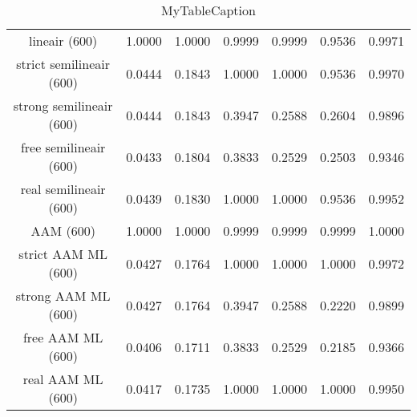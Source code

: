 \begin{table}
\centering
\begin{tabular}{|c|c|c|c|c|c|c|}
\hline
 &  &  &  &  &  &  \\
\hline
lineair (600) & 1.0000 & 1.0000 & 0.9999 & 0.9999 & 0.9536 & 0.9971 \\
\hline
strict semilineair (600) & 0.0444 & 0.1843 & 1.0000 & 1.0000 & 0.9536 & 0.9970 \\
\hline
strong semilineair (600) & 0.0444 & 0.1843 & 0.3947 & 0.2588 & 0.2604 & 0.9896 \\
\hline
free semilineair (600) & 0.0433 & 0.1804 & 0.3833 & 0.2529 & 0.2503 & 0.9346 \\
\hline
real semilineair (600) & 0.0439 & 0.1830 & 1.0000 & 1.0000 & 0.9536 & 0.9952 \\
\hline
AAM (600) & 1.0000 & 1.0000 & 0.9999 & 0.9999 & 0.9999 & 1.0000 \\
\hline
strict AAM ML (600) & 0.0427 & 0.1764 & 1.0000 & 1.0000 & 1.0000 & 0.9972 \\
\hline
strong AAM ML (600) & 0.0427 & 0.1764 & 0.3947 & 0.2588 & 0.2220 & 0.9899 \\
\hline
free AAM ML (600) & 0.0406 & 0.1711 & 0.3833 & 0.2529 & 0.2185 & 0.9366 \\
\hline
real AAM ML (600) & 0.0417 & 0.1735 & 1.0000 & 1.0000 & 1.0000 & 0.9950 \\
\hline
\end{tabular}
\caption{MyTableCaption}
\label{table:MyTableLabel}
\end{table}
